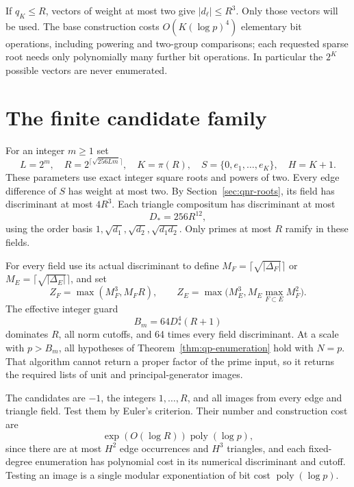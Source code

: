 If $q_K\leq R$, vectors of weight at most two give
$|d_\ell|\leq R^3$.  Only those vectors will be used.
The base construction costs
$O(K(\log p)^4)$ elementary bit operations, including powering and
two-group comparisons; each requested sparse root needs only
polynomially many further bit operations.  In particular the
$2^K$ possible vectors are never enumerated.

\section{The finite candidate family}
\label{sec:qnr-family}

For an integer $m\geq1$ set
\begin{equation}
 L=2^m,\quad R=2^{\lceil\sqrt{256Lm}\rceil},\quad
 K=\pi(R),\quad S=\{0,e_1,\ldots,e_K\},\quad H=K+1.
 \label{eq:qnr-scale}
\end{equation}
These parameters use exact integer square roots and powers of two.
Every edge difference of $S$ has weight at most two.
By Section~\ref{sec:qnr-roots}, its field has discriminant at most
$4R^3$.  Each triangle compositum has discriminant at most
\[
 D_*=256R^{12},
\]
using the order basis
$1,\sqrt{d_1},\sqrt{d_2},\sqrt{d_1d_2}$.
Only primes at most $R$ ramify in these fields.

For every field use its actual discriminant to define
$M_F=\lceil\sqrt{|\Delta_F|}\rceil$ or
$M_E=\lceil\sqrt{|\Delta_E|}\rceil$, and set
\[
 Z_F=\max(M_F^3,M_FR),\qquad
 Z_E=\max\bigl(M_E^3,M_E\max_{F\subset E}M_F^2\bigr).
\]
The effective integer guard
\begin{equation}
 B_m=64D_*^4(R+1)
 \label{eq:qnr-guard}
\end{equation}
dominates $R$, all norm cutoffs, and 64 times every field discriminant.
At a scale with $p>B_m$, all hypotheses of
Theorem~\ref{thm:qp-enumeration} hold with $N=p$.
That algorithm cannot return a proper factor of the prime input, so it
returns the required lists of unit and principal-generator images.

The candidates are $-1$, the integers $1,\ldots,R$, and all images
from every edge and triangle field.  Test them by Euler's criterion.
Their number and construction cost are
\begin{equation}
 \exp(O(\log R))\operatorname{poly}(\log p),
 \label{eq:qnr-family-cost}
\end{equation}
since there are at most $H^2$ edge occurrences and $H^3$ triangles,
and each fixed-degree enumeration has polynomial cost in its numerical
discriminant and cutoff.  Testing an image is a single modular
exponentiation of bit cost $\operatorname{poly}(\log p)$.

